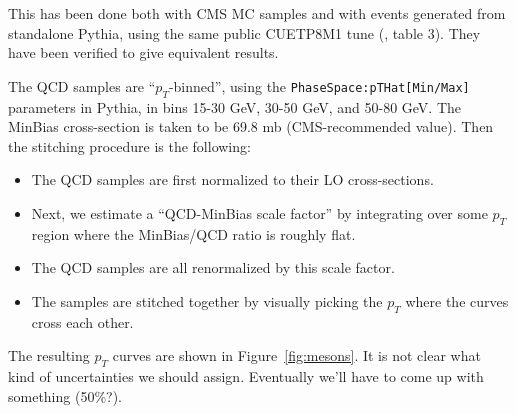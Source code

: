 \documentclass[12pt]{article}
\begin{document}

This has been done both with CMS MC samples and with events generated
from standalone Pythia, using the same public CUETP8M1 tune (\cite{CMS:tunes}, table 3).
They have been verified to give equivalent results.

The QCD samples are
``$p_T$-binned'', using the \texttt{PhaseSpace:pTHat[Min/Max]} parameters in Pythia, 
in bins 15-30 GeV, 30-50 GeV, and 50-80 GeV.  
The MinBias cross-section is taken to be 69.8 mb (CMS-recommended value).  
Then the stitching procedure is the following:
\begin{itemize}
\item The QCD samples are first normalized to their LO cross-sections.
\item Next, we estimate a ``QCD-MinBias scale factor'' by integrating
  over some $p_T$ region where the MinBias/QCD ratio is roughly flat.
\item The QCD samples are all renormalized by this scale factor.
\item The samples are stitched together by visually picking the 
$p_T$ where the curves cross each other.
\end{itemize}
\noindent The resulting $p_T$ curves are shown in
Figure~\ref{fig:mesons}.  It is not clear what kind of uncertainties
we should assign.  Eventually we'll have to come up with something (50\%?).
\end{document}
